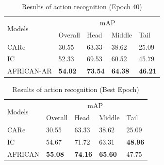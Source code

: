 

\begin{table}[ht]
    \centering
    \caption{Results of action recognition (Epoch 40)}
    \label{tab:allresults40}
    \begin{tabular}{lllll}
        \toprule
        \multirow{2}{*}{Models} & \multicolumn{4}{c}{mAP} \\
        \cmidrule{2-5} 
        {} & Overall & Head  & Middle & Tail \\
        \midrule
        CARe          & 30.55   & 63.33 & 38.62 & 25.09 \\
        IC            & 52.33   & 69.53 & 60.52 & 45.79 \\        
        AFRICAN-AR    & \textbf{54.02} & \textbf{73.54} & \textbf{64.38} & \textbf{46.21} \\
        \bottomrule
    \end{tabular}
\end{table}

\begin{table}[ht]
    \centering
    \caption{Results of action recognition (Best Epoch)}
    \label{tab:allresultsbest}
    \begin{tabular}{lllll}
        \toprule
        \multirow{2}{*}{Models} & \multicolumn{4}{c}{mAP} \\
        \cmidrule{2-5} 
        {} & Overall & Head  & Middle & Tail \\
        \midrule
        CARe        & 30.55   & 63.33 & 38.62  & 25.09 \\
        IC          & 54.67   & 71.72 & 63.31 & \textbf{48.96} \\
        AFRICAN     & \textbf{55.08} & \textbf{74.16} & \textbf{65.60} & 47.75 \\
        \bottomrule
    \end{tabular}
\end{table}






